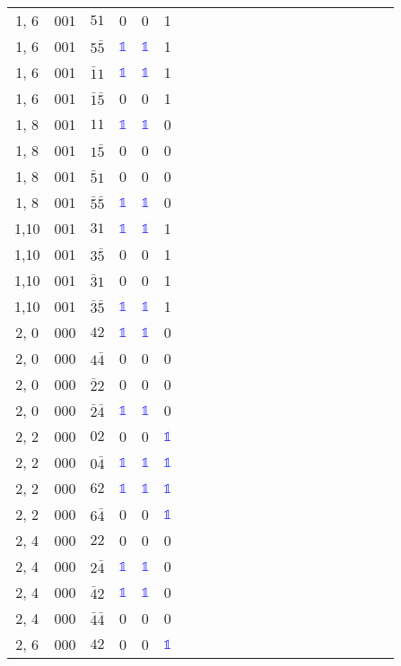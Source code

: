 \begin{longtable*}{c| cccccccccccccccccccc }
1, 6& 001& $51$& 0& 0& 1\\
1, 6& 001& $5\bar{5}$& \textcolor{blue}{$\mathds{1}$}& \textcolor{blue}{$\mathds{1}$}& 1\\
1, 6& 001& $\bar{1}1$& \textcolor{blue}{$\mathds{1}$}& \textcolor{blue}{$\mathds{1}$}& 1\\
1, 6& 001& $\bar{1}\bar{5}$& 0& 0& 1\\
1, 8& 001& $11$& \textcolor{blue}{$\mathds{1}$}& \textcolor{blue}{$\mathds{1}$}& 0\\
1, 8& 001& $1\bar{5}$& 0& 0& 0\\
1, 8& 001& $\bar{5}1$& 0& 0& 0\\
1, 8& 001& $\bar{5}\bar{5}$& \textcolor{blue}{$\mathds{1}$}& \textcolor{blue}{$\mathds{1}$}& 0\\
1,10& 001& $31$& \textcolor{blue}{$\mathds{1}$}& \textcolor{blue}{$\mathds{1}$}& 1\\
1,10& 001& $3\bar{5}$& 0& 0& 1\\
1,10& 001& $\bar{3}1$& 0& 0& 1\\
1,10& 001& $\bar{3}\bar{5}$& \textcolor{blue}{$\mathds{1}$}& \textcolor{blue}{$\mathds{1}$}& 1\\
2, 0& 000& $42$& \textcolor{blue}{$\mathds{1}$}& \textcolor{blue}{$\mathds{1}$}& 0\\
2, 0& 000& $4\bar{4}$& 0& 0& 0\\
2, 0& 000& $\bar{2}2$& 0& 0& 0\\
2, 0& 000& $\bar{2}\bar{4}$& \textcolor{blue}{$\mathds{1}$}& \textcolor{blue}{$\mathds{1}$}& 0\\
2, 2& 000& $02$& 0& 0& \textcolor{blue}{$\mathds{1}$}\\
2, 2& 000& $0\bar{4}$& \textcolor{blue}{$\mathds{1}$}& \textcolor{blue}{$\mathds{1}$}& \textcolor{blue}{$\mathds{1}$}\\
2, 2& 000& $62$& \textcolor{blue}{$\mathds{1}$}& \textcolor{blue}{$\mathds{1}$}& \textcolor{blue}{$\mathds{1}$}\\
2, 2& 000& $6\bar{4}$& 0& 0& \textcolor{blue}{$\mathds{1}$}\\
2, 4& 000& $22$& 0& 0& 0\\
2, 4& 000& $2\bar{4}$& \textcolor{blue}{$\mathds{1}$}& \textcolor{blue}{$\mathds{1}$}& 0\\
2, 4& 000& $\bar{4}2$& \textcolor{blue}{$\mathds{1}$}& \textcolor{blue}{$\mathds{1}$}& 0\\
2, 4& 000& $\bar{4}\bar{4}$& 0& 0& 0\\
2, 6& 000& $42$& 0& 0& \textcolor{blue}{$\mathds{1}$}\\

\end{longtable*}
